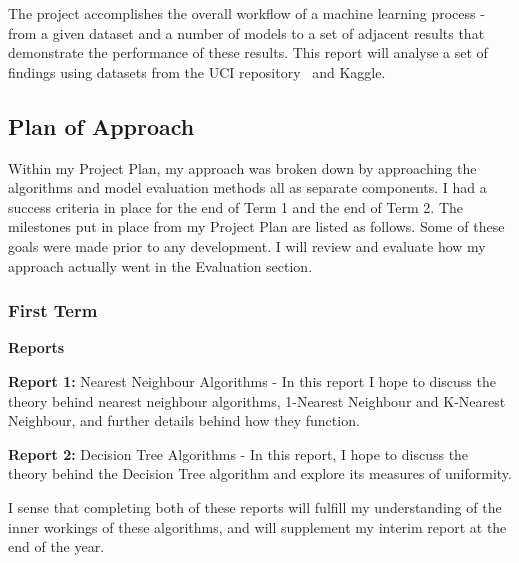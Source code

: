 \documentclass[letterpaper,10pt]{article}
\begin{document}
The project accomplishes the overall workflow of a machine learning process - from a given dataset and a number of models to a set of adjacent results that demonstrate the performance of these results. This report will analyse a set of findings using datasets from the UCI repository~\cite{uci} and Kaggle.

\newpage
\subsection{Plan of Approach} \label{aimsobjectives}
Within my Project Plan, my approach was broken down by approaching the algorithms and model evaluation methods all as separate components. I had a success criteria in place for the end of Term 1 and the end of Term 2. The milestones put in place from my Project Plan are listed as follows. Some of these goals were made prior to any development. I will review and evaluate how my approach actually went in the Evaluation section.

\subsubsection{First Term}
\textbf{Reports} \par
\textbf{Report 1:} Nearest Neighbour Algorithms - In this report I hope to discuss the theory behind nearest neighbour algorithms, 1-Nearest Neighbour and K-Nearest Neighbour, and further details behind how they function. \par 
\noindent \textbf{Report 2:} Decision Tree Algorithms - In this report, I hope to discuss the theory behind the Decision Tree algorithm and explore its measures of uniformity. \par
\vspace{2mm}
I sense that completing both of these reports will fulfill my understanding of the inner workings of these algorithms, and will supplement my interim report at the end of the year. \par
\end{document}
